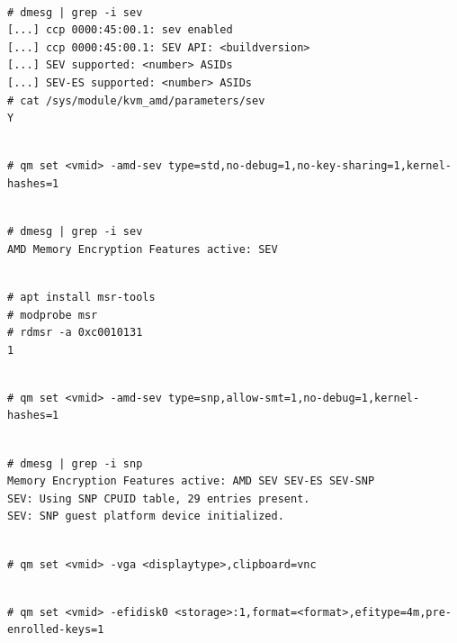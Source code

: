 \begin{lstlisting}

# dmesg | grep -i sev
[...] ccp 0000:45:00.1: sev enabled
[...] ccp 0000:45:00.1: SEV API: <buildversion>
[...] SEV supported: <number> ASIDs
[...] SEV-ES supported: <number> ASIDs
# cat /sys/module/kvm_amd/parameters/sev
Y

\end{lstlisting}

\begin{lstlisting}

# qm set <vmid> -amd-sev type=std,no-debug=1,no-key-sharing=1,kernel-hashes=1

\end{lstlisting}

\begin{lstlisting}

# dmesg | grep -i sev
AMD Memory Encryption Features active: SEV

\end{lstlisting}

\begin{lstlisting}

# apt install msr-tools
# modprobe msr
# rdmsr -a 0xc0010131
1

\end{lstlisting}

\begin{lstlisting}

# qm set <vmid> -amd-sev type=snp,allow-smt=1,no-debug=1,kernel-hashes=1

\end{lstlisting}

\begin{lstlisting}

# dmesg | grep -i snp
Memory Encryption Features active: AMD SEV SEV-ES SEV-SNP
SEV: Using SNP CPUID table, 29 entries present.
SEV: SNP guest platform device initialized.

\end{lstlisting}

\begin{lstlisting}

# qm set <vmid> -vga <displaytype>,clipboard=vnc

\end{lstlisting}

\begin{lstlisting}

# qm set <vmid> -efidisk0 <storage>:1,format=<format>,efitype=4m,pre-enrolled-keys=1

\end{lstlisting}

